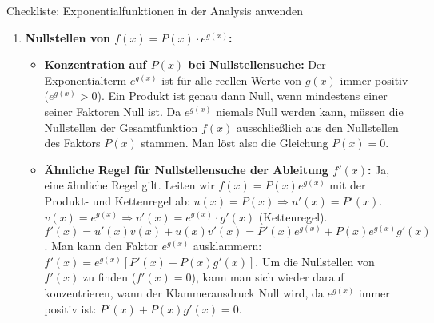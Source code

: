 \begin{loesungsumgebung}{Checkliste: Exponentialfunktionen in der Analysis anwenden}

\begin{enumerate}[label=(\alph*)]
    \item \textbf{Nullstellen von $f(x) = P(x) \cdot e^{g(x)}$:}
    \begin{itemize}
        \item \textbf{Konzentration auf $P(x)$ bei Nullstellensuche:}
        Der Exponentialterm $e^{g(x)}$ ist für alle reellen Werte von $g(x)$ immer positiv ($e^{g(x)} > 0$). Ein Produkt ist genau dann Null, wenn mindestens einer seiner Faktoren Null ist. Da $e^{g(x)}$ niemals Null werden kann, müssen die Nullstellen der Gesamtfunktion $f(x)$ ausschließlich aus den Nullstellen des Faktors $P(x)$ stammen. Man löst also die Gleichung $P(x)=0$.

        \item \textbf{Ähnliche Regel für Nullstellensuche der Ableitung $f'(x)$:}
        Ja, eine ähnliche Regel gilt. Leiten wir $f(x) = P(x)e^{g(x)}$ mit der Produkt- und Kettenregel ab:
        $u(x) = P(x) \Rightarrow u'(x) = P'(x)$.
        $v(x) = e^{g(x)} \Rightarrow v'(x) = e^{g(x)} \cdot g'(x)$ (Kettenregel).
        $f'(x) = u'(x)v(x) + u(x)v'(x) = P'(x)e^{g(x)} + P(x)e^{g(x)}g'(x)$.
        Man kann den Faktor $e^{g(x)}$ ausklammern:
        $f'(x) = e^{g(x)} [P'(x) + P(x)g'(x)]$.
        Um die Nullstellen von $f'(x)$ zu finden ($f'(x)=0$), kann man sich wieder darauf konzentrieren, wann der Klammerausdruck Null wird, da $e^{g(x)}$ immer positiv ist:
        $P'(x) + P(x)g'(x) = 0$.
    \end{itemize}


\end{enumerate}
\end{loesungsumgebung}
